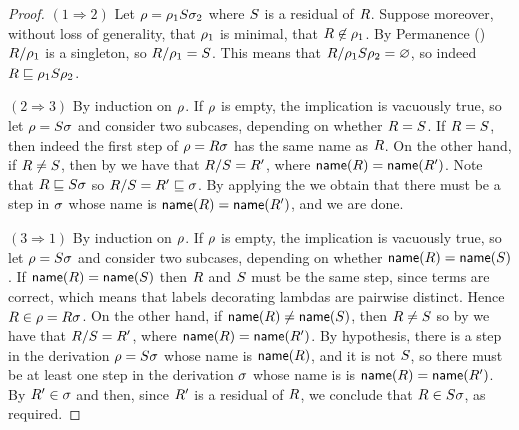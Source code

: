 \begin{proof}
$(1 \Rightarrow 2)$
  Let $\rho = \rho_1S\sigma_2$ where $S$ is a residual of $R$.
  Suppose moreover, without loss of generality,
  that $\rho_1$ is minimal, \ie that $R \not\in \rho_1$.
  By Permanence () $R/\rho_1$ is a singleton,
  so $R/\rho_1 = S$.
  This means that $R/\rho_1S\rho_2 = \varnothing$,
  so indeed $R \sqsubseteq \rho_1S\rho_2$.

$(2 \Rightarrow 3)$
  By induction on $\rho$.
  If $\rho$ is empty, the implication is vacuously true,
  so let $\rho = S\sigma$
  and consider two subcases, depending on whether $R = S$.
  If $R = S$, then indeed the first step of $\rho = R\sigma$
  has the same name as $R$.
  On the other hand, if $R \neq S$, 
  then by 
  we have that $R/S = R'$,
  where $\mathsf{name}(R) = \mathsf{name}(R')$.
  Note that $R \sqsubseteq S\sigma$ 
  so $R/S = R' \sqsubseteq \sigma$.
  By applying the \ih we obtain that there must be a step in $\sigma$
  whose name is $\mathsf{name}(R) = \mathsf{name}(R')$, and we are done.

$(3 \Rightarrow 1)$
  By induction on $\rho$.
  If $\rho$ is empty, the implication is vacuously true,
  so let $\rho = S\sigma$
  and consider two subcases, depending on whether $\mathsf{name}(R) = \mathsf{name}(S)$.
  If $\mathsf{name}(R) = \mathsf{name}(S)$ then $R$ and $S$ must be the same step,
  since terms are correct, which means that labels decorating lambdas are pairwise distinct.
  Hence $R \in \rho = R\sigma$.
  On the other hand, if $\mathsf{name}(R) \neq \mathsf{name}(S)$, then
  $R \neq S$ so by 
  we have that $R/S = R'$,
  where $\mathsf{name}(R) = \mathsf{name}(R')$.
  By hypothesis, there is a step in the derivation $\rho = S\sigma$ whose name
  is $\mathsf{name}(R)$, and it is not $S$, so there must be at least one step in the
  derivation $\sigma$ whose name is is $\mathsf{name}(R) = \mathsf{name}(R')$.
  By \ih $R' \in \sigma$
  and then, since $R'$ is a residual of $R$,
  we conclude that $R \in S\sigma$,
  as required.
\end{proof}

\bigskip

